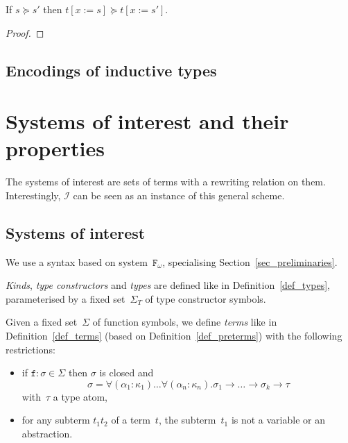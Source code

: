 \documentclass[runningheads,a4paper]{llncs}
\newcommand{\Fomega}{\mathtt{F}_\omega}
\newcommand{\Iterms}{\mathcal{I}}
\newcommand{\arrtype}{\rightarrow}
\newcommand{\subst}[2]{#1:=#2}
\begin{document}
\begin{lemma}\label{lem_succeq_subst}
  If $s \succeq s'$ then $t[\subst{x}{s}] \succeq t[\subst{x}{s'}]$.
\end{lemma}

\begin{proof}
\end{proof}

\subsection{Encodings of inductive types}\label{sec_encodings}


\section{Systems of interest and their properties}\label{sec:systems}

The systems of interest are sets of terms with a rewriting relation on
them. Interestingly, $\Iterms$ can be seen as an instance of this
general scheme.

\subsection{Systems of interest}

We use a syntax based on system~$\Fomega$, specialising
Section~\ref{sec_preliminaries}.

\begin{definition}\normalfont
  \emph{Kinds}, \emph{type constructors} and \emph{types} are defined
  like in Definition~\ref{def_types}, parameterised by a fixed
  set~$\Sigma_T$ of type constructor symbols.

  Given a fixed set~$\Sigma$ of function symbols, we define
  \emph{terms} like in Definition~\ref{def_terms} (based on
  Definition~\ref{def_preterms}) with the following restrictions:
  \begin{itemize}
  \item if $\mathtt{f} : \sigma \in \Sigma$ then $\sigma$ is closed and
    \[
    \sigma = \forall (\alpha_1 : \kappa_1) \ldots \forall (\alpha_n : \kappa_n)
    . \sigma_1 \arrtype \ldots \arrtype \sigma_k \arrtype \tau
    \]
    with~$\tau$ a type atom,
  \item for any subterm $t_1 t_2$ of a term~$t$, the subterm~$t_1$ is
    not a variable or an abstraction.
  \end{itemize}
\end{definition}
\end{document}
